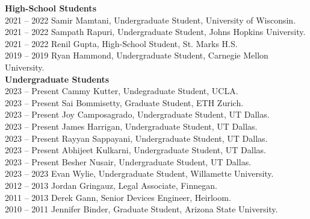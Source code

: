 
\textbf{High-School Students} \\
2021 -- 2022 \hspace{28pt} Samir Mamtani, Undergraduate Student, University of Wisconsin. \\
2021 -- 2022 \hspace{28pt} Sampath Rapuri, Undergraduate Student, Johns Hopkins University. \\
2021 -- 2022 \hspace{28pt} Renil Gupta, High-School Student, St. Marks H.S. \\
2019 -- 2019 \hspace{28pt} Ryan Hammond, Undergraduate Student, Carnegie Mellon University. \\

\textbf{Undergraduate Students} \\
2023 -- Present \hspace{14pt} Cammy Kutter, Undegraduate Student, UCLA. \\
2023 -- Present \hspace{14pt} Sai Bommisetty, Graduate Student, ETH Zurich. \\
2023 -- Present \hspace{14pt} Joy Camposagrado, Undergraduate Student, UT Dallas. \\
2023 -- Present \hspace{14pt} James Harrigan, Undergraduate Student, UT Dallas. \\
2023 -- Present \hspace{14pt} Rayyan Sappayani, Undergraduate Student, UT Dallas. \\
2023 -- Present \hspace{14pt} Abhijeet Kulkarni, Undergraduate Student, UT Dallas. \\
2023 -- Present \hspace{14pt} Besher Nusair, Undergraduate Student, UT Dallas. \\
2023 -- 2023 \hspace{28pt} Evan Wylie, Undergraduate Student, Willamette University. \\
2012 -- 2013 \hspace{28pt} Jordan Gringauz, Legal Associate, Finnegan. \\
2011 -- 2013 \hspace{28pt} Derek Gann, Senior Devices Engineer, Heirloom. \\
2010 -- 2011 \hspace{28pt} Jennifer Binder, Graduate Student, Arizona State University. \\

